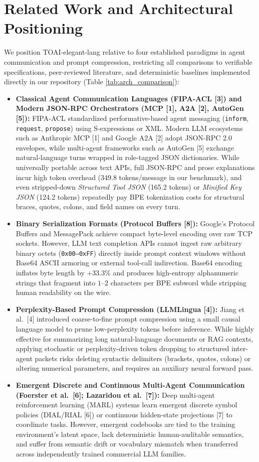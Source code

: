 \documentclass[9pt,a4paper]{extarticle}
\begin{document}
\section{Related Work and Architectural Positioning}
We position TOAI-elegant-lang relative to four established paradigms in agent communication and prompt compression, restricting all comparisons to verifiable specifications, peer-reviewed literature, and deterministic baselines implemented directly in our repository (Table \ref{tab:arch_comparison}):

\begin{itemize}
  \item \textbf{Classical Agent Communication Languages (FIPA-ACL [3]) and Modern JSON-RPC Orchestrators (MCP [1], A2A [2], AutoGen [5]):} FIPA-ACL standardized performative-based agent messaging (\texttt{inform}, \texttt{request}, \texttt{propose}) using S-expressions or XML. Modern LLM ecosystems such as Anthropic MCP [1] and Google A2A [2] adopt JSON-RPC 2.0 envelopes, while multi-agent frameworks such as AutoGen [5] exchange natural-language turns wrapped in role-tagged JSON dictionaries. While universally portable across text APIs, full JSON-RPC and prose explanations incur high token overhead (349.8 tokens/message in our benchmark), and even stripped-down \emph{Structured Tool JSON} (165.2 tokens) or \emph{Minified Key JSON} (124.2 tokens) repeatedly pay BPE tokenization costs for structural braces, quotes, colons, and field names on every turn.
  \item \textbf{Binary Serialization Formats (Protocol Buffers [8]):} Google's Protocol Buffers and MessagePack achieve compact byte-level encoding over raw TCP sockets. However, LLM text completion APIs cannot ingest raw arbitrary binary octets (\texttt{0x00--0xFF}) directly inside prompt context windows without Base64 ASCII armoring or external tool-call indirection. Base64 encoding inflates byte length by $+33.3\%$ and produces high-entropy alphanumeric strings that fragment into $1\text{--}2$ characters per BPE subword while stripping human readability on the wire.
  \item \textbf{Perplexity-Based Prompt Compression (LLMLingua [4]):} Jiang et al.\ [4] introduced coarse-to-fine prompt compression using a small causal language model to prune low-perplexity tokens before inference. While highly effective for summarizing long natural-language documents or RAG contexts, applying stochastic or perplexity-driven token dropping to structured inter-agent packets risks deleting syntactic delimiters (brackets, quotes, colons) or altering numerical parameters, and requires an auxiliary neural forward pass.
  \item \textbf{Emergent Discrete and Continuous Multi-Agent Communication (Foerster et al.\ [6]; Lazaridou et al.\ [7]):} Deep multi-agent reinforcement learning (MARL) systems learn emergent discrete symbol policies (DIAL/RIAL [6]) or continuous hidden-state projections [7] to coordinate tasks. However, emergent codebooks are tied to the training environment's latent space, lack deterministic human-auditable semantics, and suffer from semantic drift or vocabulary mismatch when transferred across independently trained commercial LLM families.
\end{itemize}
\end{document}
